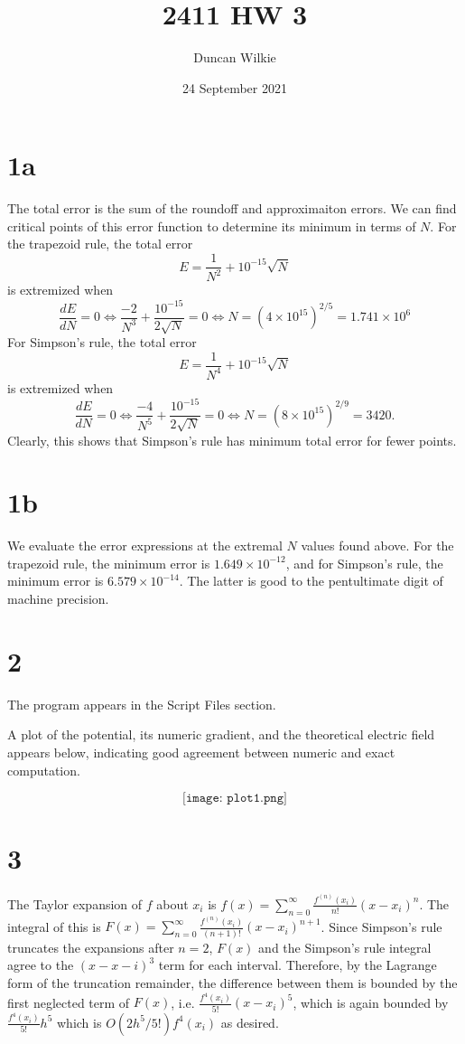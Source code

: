 \documentclass{article}
\title{2411 HW 3}
\author{Duncan Wilkie}
\date{24 September 2021}
\begin{document}
\section*{1a}
The total error is the sum of the roundoff and approximaiton errors.
We can find critical points of this error function to determine its minimum in terms of $N$.
For the trapezoid rule, the total error
\[E=\frac{1}{N^2}+10^{-15}\sqrt{N}\]
is extremized when
\[\frac{dE}{dN} = 0\Leftrightarrow \frac{-2}{N^3}+\frac{10^{-15}}{2\sqrt{N}} = 0\Leftrightarrow N=(4\times 10^{15})^{2/5}=1.741\times10^6\]
For Simpson's rule, the total error
\[E=\frac{1}{N^4}+10^{-15}\sqrt{N}\]
is extremized when
\[\frac{dE}{dN}=0\Leftrightarrow \frac{-4}{N^5}+\frac{10^{-15}}{2\sqrt{N}} = 0 \Leftrightarrow N = (8\times 10^{15})^{2/9}=3420.\]
Clearly, this shows that Simpson's rule has minimum total error for fewer points.

\section*{1b}
We evaluate the error expressions at the extremal $N$ values found above.
For the trapezoid rule, the minimum error is $1.649\times 10^{-12}$, and for Simpson's rule, the minimum error is $6.579\times10^{-14}$.
The latter is good to the pentultimate digit of machine precision.

\section*{2}
The program appears in the Script Files section.

A plot of the potential, its numeric gradient, and the theoretical electric field appears below, indicating good agreement between numeric and exact computation.

\[\texttt{[image: plot1.png]}\]

\section*{3}
The Taylor expansion of $f$ about $x_i$ is $f(x) = \sum_{n=0}^\infty\frac{f^{(n)}(x_i)}{n!}(x-x_i)^n$. The integral of this is $F(x) =\sum_{n=0}^\infty\frac{f^{(n)}(x_i)}{(n+1)!}(x-x_i)^{n+1}$. Since Simpson's rule truncates the expansions after $n=2$, $F(x)$ and the Simpson's rule integral agree to the $(x-x-i)^3$ term for each interval. Therefore, by the Lagrange form of the truncation remainder, the difference between them is bounded by the first neglected term of $F(x)$, i.e. $\frac{f^4(x_i)}{5!}(x-x_i)^5$, which is again bounded by $\frac{f^4(x_i)}{5!}h^5$ which is $O(2h^5/5!)f^4(x_i)$ as desired.
\end{document}
